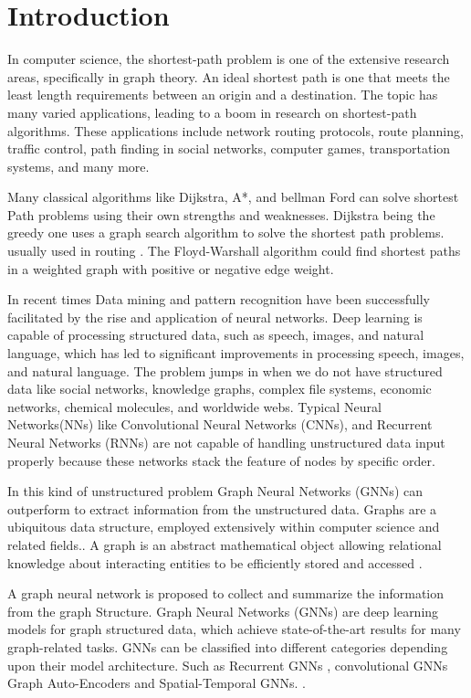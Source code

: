 
\section{Introduction}
In computer science, the shortest-path problem is one of the extensive research areas, speciﬁcally in graph theory. An ideal shortest path is one that meets the least length requirements between an origin and a destination. The topic has many varied applications, leading to a boom in research on shortest-path algorithms. These applications include network routing protocols, route planning, traﬃc control, path ﬁnding in social networks, computer games, transportation systems, and many more. \cite{DBLP:journals/corr/MadkourARRB17}

Many classical algorithms like Dijkstra, A*, and bellman Ford can solve shortest Path problems using their own strengths and weaknesses. Dijkstra being the greedy one uses a graph search algorithm to solve the shortest path problems. \cite{article} usually used in routing \cite{rticle}. The Floyd-Warshall algorithm could find shortest paths in a weighted graph with positive or negative edge weight. \cite{arrticle}
 
In recent times Data mining and pattern recognition have been successfully facilitated by the rise and application of neural networks. Deep learning is capable of processing structured data, such as speech, images, and natural language, which has led to significant improvements in processing speech, images, and natural language. The problem jumps in when we do not have structured data like social networks, knowledge graphs, complex file systems, economic networks, chemical molecules, and worldwide webs. Typical Neural Networks(NNs) like Convolutional Neural Networks (CNNs), and Recurrent Neural Networks (RNNs) are not capable of handling unstructured data input properly because these networks stack the feature of nodes by specific order. \cite{Mendoza_2019}

In this kind of unstructured problem Graph Neural Networks (GNNs) can outperform to extract information from the unstructured data. Graphs are a ubiquitous data structure, employed extensively within computer science and related fields.\cite{DBLP:journals/corr/abs-1709-05584}. A graph  is an abstract mathematical object \cite{article} allowing relational knowledge about interacting entities to be efficiently stored and accessed \cite{10.1145/1322432.1322433}.

A graph neural network is proposed to collect and summarize the information from the graph Structure. \cite{DBLP:journals/corr/abs-1812-04202}
Graph Neural Networks (GNNs)  are deep learning models for graph structured data, which achieve state-of-the-art results for many graph-related tasks.\cite{data7010010}
GNNs can be classified into different categories depending upon their model architecture. \cite{DBLP:journals/corr/abs-1901-00596}
Such as Recurrent GNNs \cite{inproceedings}, convolutional GNNs \cite{DBLP:journals/corr/HamiltonYL17}
\cite{DBLP:journals/corr/KipfW16}
Graph Auto-Encoders \cite{https://doi.org/10.48550/arxiv.1611.07308}
and Spatial-Temporal GNNs. \cite{Yan_Xiong_Lin_2018}.
